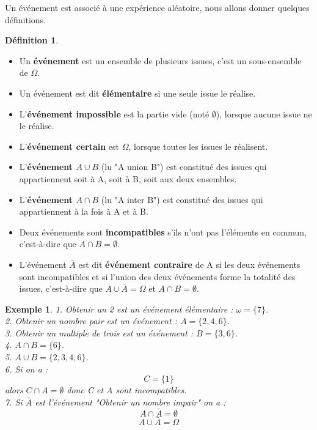 \documentclass[a4paper,12pt,final]{article}
\newtheorem{Ex}{Exemple}[section]
\theoremstyle{theorem}
\theoremstyle{definition}
\theoremstyle{definition}
\theoremstyle{definition}
\newtheorem{Def}{Définition}[section]
\begin{document}
		Un événement est associé à une expérience aléatoire, nous allons donner quelques définitions.
		
		\begin{Def}
			\begin{itemize}
				\item Un \textbf{événement} est un ensemble de plusieurs issues, c'est un sous-ensemble de $\Omega$.
				\item Un événement est dit \textbf{élémentaire} si une seule issue le réalise.
				\item L'\textbf{événement impossible} est la partie vide (noté $\emptyset$), lorsque aucune issue ne le réalise.
				\item L'\textbf{événement certain} est $\Omega$, lorsque toutes les issues le réalisent.
				\item L'\textbf{événement $A\cup B$} (lu "A union B") est constitué des issues qui appartiennent soit à A, soit à B, soit aux deux ensembles.
				\item L'\textbf{événement $A\cap B$} (lu "A inter B") est constitué des issues qui appartiennent à la fois à A et à B.
				\item Deux événements sont \textbf{incompatibles} s'ils n'ont pas l'éléments en commun, c'est-à-dire que $A\cap B = \emptyset$.
				\item L'événement $\bar{A}$ est dit \textbf{événement contraire} de A si les deux événements sont incompatibles et si l'union des deux événements forme la totalité des issues, c'est-à-dire que $A\cup \bar{A} = \Omega$ et $A\cap B = \emptyset$.
			\end{itemize}		
		\end{Def}

		\begin{Ex}
			1. Obtenir un 2 est un événement élémentaire : $\omega = \{7\}$. \\
			2. Obtenir un nombre pair est un événement : $A = \{2,4,6\}$. \\
			3. Obtenir un multiple de trois est un événement : $B = \{3,6\}$. \\
			4. $A\cap B = \{6\}$. \\
			5. $A\cup B = \{2,3,4,6\}$. \\
			6. Si on a : \[C = \{1\}\] alors $C\cap A = \emptyset$ donc C et A sont incompatibles. \\
			7. Si $\bar{A}$ est l'événement "Obtenir un nombre impair" on a : \[A\cap \bar{A} = \emptyset\]
			\[A\cup \bar{A} = \Omega\]
			
		\end{Ex}
	
\end{document}
